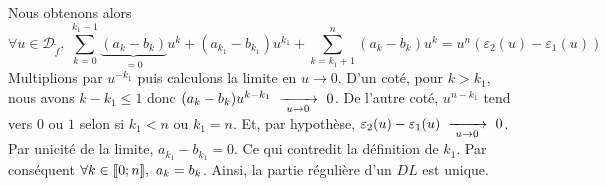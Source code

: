 \documentclass{article}
\begin{document}
\begin{question_kholle}
\begin{equation*}
	\end{equation*}
	Nous obtenons alors
	\begin{equation*}
		\forall u \in \mathcal{D}_{\tilde{f}}, \
		\sum_{k=0}^{k_1-1} \underbrace{(a_k - b_k)}_{=0} u^k + (a_{k_1} - b_{k_1}) u^{k_1} + \sum_{k=k_1+1}^{n} (a_k - b_k) u^k = u^n \left( \varepsilon_2(u) - \varepsilon_1(u) \right)
	\end{equation*}
	Multiplions par $u^{-k_1}$ puis calculons la limite en $u \rightarrow 0$.
	D'un coté, pour $k > k_1$, nous avons $k - k_1 \leqslant 1$ donc $(a_k - b_k) u^{k-k_1} \ \xrightarrow[\;u \to 0\;]{}\  0$.
	De l'autre coté, $u^{n-k_1}$ tend vers $0$ ou $1$ selon si $k_1 < n$ ou $k_1 = n$. Et, par hypothèse, $\varepsilon_2(u) - \varepsilon_1(u) \ \xrightarrow[\;u \to 0\;]{}\  0$.
	Par unicité de la limite, $a_{k_1} - b_{k_1} = 0$. Ce qui contredit la définition de $k_1$.
	Par conséquent $\forall k \in [\![ 0;n ]\!], \ a_k = b_k$. Ainsi, la partie régulière d'un $DL$ est unique.
\end{question_kholle}
\end{document}
